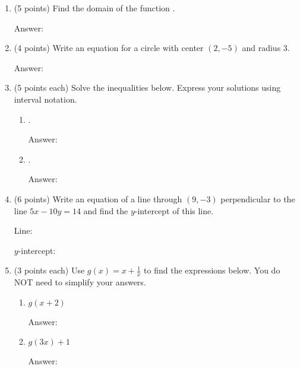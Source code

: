 \documentclass[12pt]{article}
\begin{document}
\begin{enumerate}
\item (5 points) Find the domain of the function .\\
\begin{flushright}{ Answer:\underline{\hspace{2in}}}\end{flushright}
\vfill
\newpage
\item (4 points) Write an equation for a circle with center $(2,-5)$ and radius 3.
\begin{flushright}{ Answer:\underline{\hspace{2in}}}\end{flushright}
\vspace{.3in}
\item (5 points each) Solve the inequalities below. Express your solutions using interval notation.
\begin{enumerate}
\item  \scalebox{1.2}{$\vert 2x+1 \vert +3 > 5$}.
\begin{flushright}{ Answer:\underline{\hspace{2in}}}\end{flushright}
\vfill
\item  {}.
\begin{flushright}{ Answer:\underline{\hspace{2in}}}\end{flushright}
\vfill
\end{enumerate}
\item (6 points) Write an equation of a line through $(9,-3)$ perpendicular to the line $5x-10y=14$ and find the $y$-intercept of this line.
\begin{flushright}{ Line:\underline{\hspace{2in}}}\end{flushright}
\begin{flushright}{ $y$-intercept:\underline{\hspace{2in}}}\end{flushright}
\vfill
\newpage	
\item (3 points each) Use $g(x)=x+\frac{1}{x}$ to find the expressions below. You do NOT need to simplify your answers.
\begin{enumerate}
\item $g(x+2)$\\ 
\begin{flushright}{ Answer:\underline{\hspace{2in}}}\end{flushright}
\item $g(3x)+1$\\
\begin{flushright}{ Answer:\underline{\hspace{2in}}}\end{flushright}
\end{enumerate}


\end{enumerate}
\end{document}
